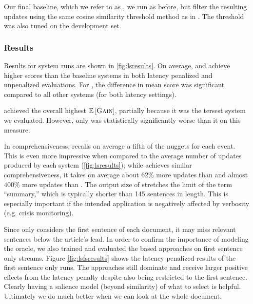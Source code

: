  Our final baseline, which we
 refer to as \modelLSCos, we run \modelLS{} as before, but filter the
 resulting updates using the same cosine similarity threshold method as in
 \modelCos. The threshold was also tuned on the development set. 


 \subsubsection{Results}
 

  Results for system runs are shown in \autoref{fig:lsresults}.  On average,
  \modelLS{} and \modelLSCos{} achieve higher \fmeasure{} scores than the baseline
 systems in both latency penalized and unpenalized evaluations. For
 \modelLSCos, the difference in mean \fmeasure{} score was significant compared
 to all other systems (for both latency settings).
 
 \sap{} achieved the overall highest $\mathbb{E}\left[\textsc{Gain}\right]$, partially because
 it was the tersest system we evaluated. However, only \modelCos{} was
 statistically significantly worse than it on this measure. %
 
 In comprehensiveness, \modelLS{} recalls on average a fifth of the nuggets
 for each event. This is even more impressive when  compared to the average
 number of updates produced by each system (\autoref{fig:lsresults}); while
 \modelCos{} achieves similar comprehensiveness, it takes on average about
 62\% more updates than \modelLS{} and almost 400\% more updates than
 \modelLSCos. The output size of \modelCos{} stretches the limit of the
 term ``summary,'' which is typically shorter than 145 sentences in length.
 This is especially important if the intended application is negatively
 affected by verbosity (e.g. crisis monitoring).

 

 Since \modelCos{} only considers the first sentence of each document, it
 may miss relevant sentences below the article's lead. In order to confirm the
 importance of modeling the oracle, we also trained and evaluated the
 \modelLS{} based approaches on first sentence only streams. Figure
 \ref{fig:lsfsresults} shows the latency penalized results of the first
 sentence only runs.  The \modelLS{} approaches still dominate \modelCos{}
 and receive larger positive effects from the latency penalty despite also
 being restricted to the first sentence. Clearly having a salience model (beyond
 similarity) of what to select is helpful. Ultimately we do much better when
 we can look at the whole document.
  
